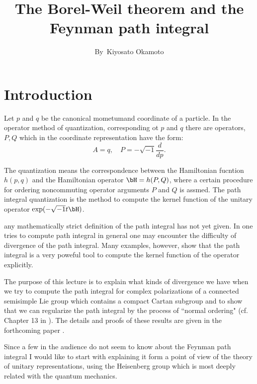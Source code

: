 \title{The Borel-Weil theorem and the Feynman path integral}

\author{By~Kiyosato Okamoto}


\date{}
\maketitle

\section*{Introduction}

Let $p$ and $q$ be the canonical mometum\pageoriginale and coordinate of a particle. In the operator method of quantization, corresponding ot $p$ and $q$ there are operators, $P, Q$ which in the coordinate representation have the form:
$$
A=q, \quad P=-\sqrt{-1}\dfrac{d}{dp}.
$$

The quantization means the correspondence between the Hamiltonian fucntion $h(p, q)$ and the Hamiltonian operator $\bH= h(P, Q)$, where a certain procedure for ordering noncommuting operator arguments $P$ and $Q$ is assmed. The path integral quantization is the method to compute the kernel function of the unitary operator $\exp(-\sqrt{-1}t \bH)$.

any mathematically strict definition of the path integral has not yet given. In one tries to compute path integral in general one may encounter the difficulty of divergence of the path integral. Many examples, however, show that the path integral is a very poweful tool to compute the kernel function of the operator explicitly.

The purpose of this lecture is to explain what kinds of divergence we have when we try to compute the path integral for complex polarizations of a connected semisimple Lie group which contains a compact Cartan subgroup and to show that we can regularize the path integral by the process of ``normal ordering" (cf. Chapter 13 in \cite{art15-key10}). The details and proofs of these results are given in the forthcoming paper \cite{art15-key7}.

Since a few in the audience do not seem to know about the Feynman path integral I would like to start with explaining it form a point of view of the theory of unitary representations, using the Heisenberg group which is most deeply related with the quantum mechanics.

